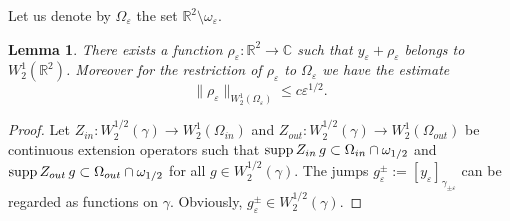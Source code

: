 \documentclass[reqno]{amsart}
\theoremstyle{plain}
\newtheorem{lem}{Lemma}
\numberwithin{equation}{section}
\newcommand{\supp}{\mathop{\rm supp}}
\newcommand{\Real}{\mathbb R}
\newcommand{\Cmpl}{\mathbb C}
\newcommand{\eps}{\varepsilon}
\renewcommand{\leq}{\leqslant}
\begin{document}
Let us denote by $\Omega_\eps$ the set $\Real^2\setminus\omega_\eps$.
\begin{lem}\label{PropW21Corrector}
There exists a function $\rho_\eps\colon \Real^2\to \Cmpl$ such that $y_\eps+\rho_\eps$ belongs to $W_2^1(\Real^2)$. Moreover for the restriction of $\rho_\eps$ to $\Omega_\eps$  we have the estimate
\begin{equation}\label{EstRhoEps}
\|\rho_\eps\|_{W_2^1(\Omega_\eps)}\leq c \eps^{1/2}.
\end{equation}
\end{lem}

\begin{proof}
Let $Z_{in}\colon W_2^{1/2}(\gamma)\to W_2^1(\Omega_{in})$ and
    $Z_{out}\colon W_2^{1/2}(\gamma)\to W_2^1(\Omega_{out})$
be  continuous extension operators such that
$\supp Z_{in} \,g\subset \Omega_{in}\cap \omega_{1/2}$ and
$\supp Z_{out} \,g\subset \Omega_{out}\cap \omega_{1/2}$
for all $g\in W_2^{1/2}(\gamma)$. The jumps $g_\eps^\pm:=[y_\eps]_{\gamma_{\pm\eps}}$ can be regarded as  functions on $\gamma$. Obviously, $g_\eps^\pm\in W_2^{1/2}(\gamma)$.





\end{proof}
\end{document}
